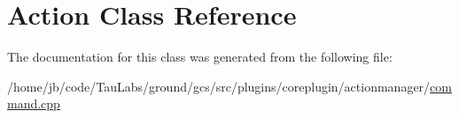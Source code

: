 \hypertarget{class_action}{\section{\-Action \-Class \-Reference}
\label{class_action}
}


\-The documentation for this class was generated from the following file\-:\begin{DoxyCompactItemize}
\item 
/home/jb/code/\-Tau\-Labs/ground/gcs/src/plugins/coreplugin/actionmanager/\hyperlink{command_8cpp}{command.\-cpp}\end{DoxyCompactItemize}
